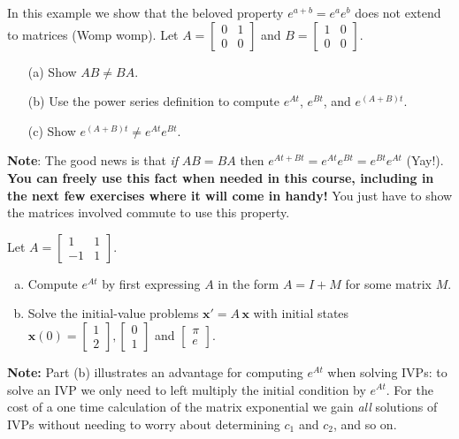 \documentclass[11pt,letterpaper,boxed]{pset}
\begin{document}
    \begin{problem} [Exercise 3.]
        In this example we show that the beloved property $e^{a+b} = e^a e^b$ does not extend  to matrices (Womp womp). Let $A = \begin{bmatrix} 0 & 1 \\ 0 & 0 \end{bmatrix}$ and $B = \begin{bmatrix} 1 & 0 \\ 0 & 0 \end{bmatrix}$.
        
        \begin{enumerate}
            \item[(a)] Show $AB \neq BA$. 
            \item[(b)] Use the power series definition to compute $e^{At}$, $e^{Bt}$, and $e^{(A+B)t}$.
            \item[(c)] Show $e^{(A+B)t} \neq e^{At} e^{Bt}.$
        \end{enumerate}
        
        \textbf{Note}: The good news is that \textit{if} $AB = BA$ then $e^{At+Bt} = e^{At} e^{Bt} = e^{Bt} e^{At}$ (Yay!). \textbf{You can freely use this fact when needed in this course, including in the next few exercises where it will come in handy!} You just have to show the matrices involved commute to use this property. 
    \end{problem}
    \newpage
    
    \begin{problem} [Exercise 4.]
        Let 
            $A = \begin{bmatrix} 1 & 1  \\ -1 & 1 \end{bmatrix}.$
        
        \begin{enumerate} [(a)]
            \item Compute $e^{At}$ by first expressing $A$  in the form  $A = I + M$ for some matrix $M$.  
            \item Solve the initial-value problems $\mathbf{x}' = A \, \mathbf{x}$ with initial states $\mathbf{x}(0)=  \begin{bmatrix} 1 \\ 2 \end{bmatrix}, \begin{bmatrix} 0 \\ 1 \end{bmatrix}$ and $\begin{bmatrix} \pi \\ e \end{bmatrix}$. 
        \end{enumerate}
        
        \textbf{Note: } Part (b) illustrates an advantage for computing $e^{At}$ when solving IVPs: to solve an IVP we only need to left multiply the initial condition by $e^{At}$. For the cost of a one time calculation of the matrix exponential we gain \textit{all} solutions of IVPs without needing to worry about determining $c_1$ and $c_2$, and so on. 
    \end{problem}
    \newpage
    
\end{document}
